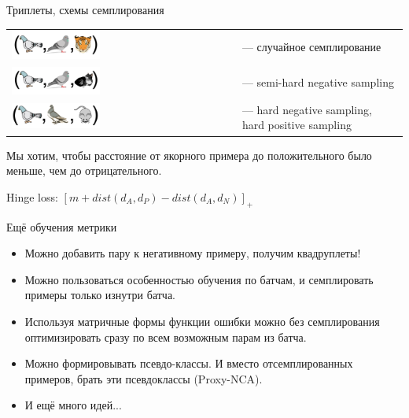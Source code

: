 \begin{frame}{Триплеты, схемы семплирования}

\begin{tabular}{m{14em} m{15em}}
    \includegraphics[width=0.4\textwidth]{images/pigeon triplet1.png} &  
    --- случайное семплирование \\
    \includegraphics[width=0.4\textwidth]{images/pigeon triplet2.png} &  
    --- semi-hard negative sampling \\
    \includegraphics[width=0.4\textwidth]{images/pigeon triplet3.png} &  
    --- hard negative sampling, hard positive sampling
\end{tabular}

Мы хотим, чтобы расстояние от якорного примера до положительного было меньше, чем до отрицательного.

Hinge loss: $ [ m + dist(d_A, d_P) - dist(d_A, d_N) ]_+ $
    
\end{frame}

\begin{frame}{Ещё обучения метрики}

\begin{itemize}
    \item Можно добавить пару к негативному примеру, получим квадруплеты!
    \item Можно пользоваться особенностью обучения по батчам, и семплировать примеры только изнутри батча.
    \item Используя матричные формы функции ошибки можно без семплирования оптимизировать сразу по всем возможным парам из батча.
    \item Можно формировывать псевдо-классы. И вместо отсемплированных примеров, брать эти псевдоклассы (Proxy-NCA).
    \item И ещё много идей...
\end{itemize}
    
\end{frame}

